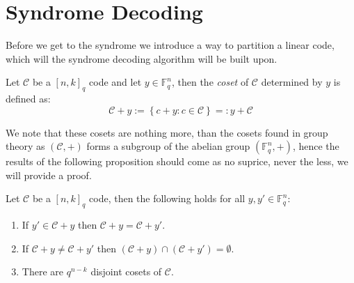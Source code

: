 \section{Syndrome Decoding} \label{sec:syndrome_decoding}
Before we get to the syndrome we introduce a way to partition a linear code, which will the syndrome decoding algorithm will be built upon.
\begin{definition}
  Let $\mathcal{C}$ be a $[n, k]_q$ code and let $y \in \mathbb{F}_q^n$, then the \textit{coset} of $\mathcal{C}$ determined by $y$ is defined as:
  \begin{equation*}
    \mathcal{C} + y := \left\{c + y : c \in \mathcal{C}\right\} =: y + \mathcal{C}
  \end{equation*}
\end{definition}
We note that these cosets are nothing more, than the cosets found in group theory as $(\mathcal{C}, +)$ forms a subgroup of the abelian group $(\mathbb{F}_q^n, +)$, hence the results of the following proposition should come as no suprice, never the less, we will provide a proof.
\begin{proposition}\label{prop:basic_properties_of_cosets}
  Let $\mathcal{C}$ be a $[n, k]_q$ code, then the following holds for all $y, y' \in \mathbb{F}_q^{n}$:
  \begin{enumerate}
    \item If $y' \in \mathcal{C} + y$ then $\mathcal{C} + y = \mathcal{C} + y'$.\label{prop:basic_properties_of_coset1}
    \item If $\mathcal{C} + y \neq \mathcal{C} + y'$ then $(\mathcal{C} + y) \cap (\mathcal{C} + y') = \emptyset$. \label{prop:basic_properties_of_coset2}
    \item There are $q^{n - k}$ disjoint cosets of $\mathcal{C}$. \label{prop:basic_properties_of_coset3}
  \end{enumerate}
\end{proposition}
